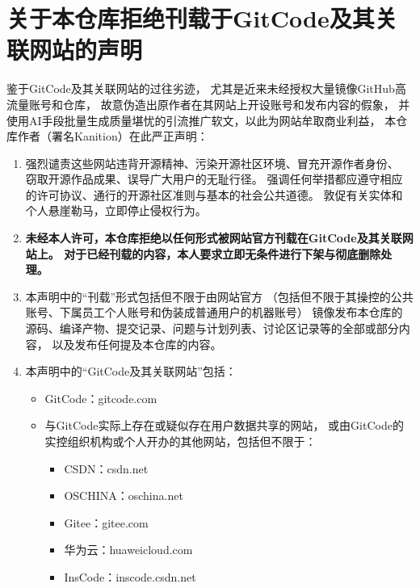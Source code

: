 \chapter[关于本仓库拒绝刊载于GitCode及其关联网站的声明]{{\LARGE 关于本仓库拒绝刊载于GitCode及其关联网站的声明}}
\label{chap:关于本仓库拒绝刊载于GitCode及其关联网站的声明}

鉴于GitCode及其关联网站的过往劣迹，
尤其是近来未经授权大量镜像GitHub高流量账号和仓库，
故意伪造出原作者在其网站上开设账号和发布内容的假象，
并使用AI手段批量生成质量堪忧的引流推广软文，以此为网站牟取商业利益，
本仓库作者（署名Kanition）在此严正声明：

\begin{enumerate}
      \item 强烈谴责这些网站违背开源精神、污染开源社区环境、冒充开源作者身份、
            窃取开源作品成果、误导广大用户的无耻行径。
            强调任何举措都应遵守相应的许可协议、通行的开源社区准则与基本的社会公共道德。
            敦促有关实体和个人悬崖勒马，立即停止侵权行为。
      \item {\bfseries 未经本人许可，本仓库拒绝以任何形式被网站官方刊载在GitCode及其关联网站上。
            对于已经刊载的内容，本人要求立即无条件进行下架与彻底删除处理。}
      \item 本声明中的“刊载”形式包括但不限于由网站官方
            （包括但不限于其操控的公共账号、下属员工个人账号和伪装成普通用户的机器账号）
            镜像发布本仓库的源码、编译产物、提交记录、问题与计划列表、讨论区记录等的全部或部分内容，
            以及发布任何提及本仓库的内容。
      \item 本声明中的“GitCode及其关联网站”包括：
            \begin{itemize}
                  \item GitCode：gitcode.com
                  \item 与GitCode实际上存在或疑似存在用户数据共享的网站，
                        或由GitCode的实控组织机构或个人开办的其他网站，包括但不限于：
                        \begin{itemize}
                              \item CSDN：csdn.net
                              \item OSCHINA：oschina.net
                              \item Gitee：gitee.com
                              \item 华为云：huaweicloud.com
                              \item InsCode：inscode.csdn.net

\end{itemize}
\end{itemize}
\end{enumerate}
